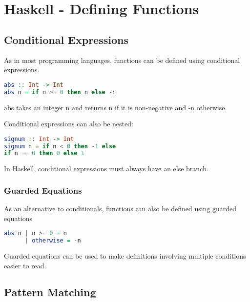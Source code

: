 \hypertarget{haskell}{%
\section{Haskell - Defining Functions}\label{haskell}}

\hypertarget{conditional-expressions}{%
\subsection{Conditional Expressions}\label{conditional-expressions}}

As in most programming languages, functions can be defined using
conditional expressions.

\begin{lstlisting}[language=Haskell]
abs :: Int -> Int
abs n = if n >= 0 then n else -n
\end{lstlisting}

abs takes an integer n and returns n if it is non-negative and -n
otherwise.

Conditional expressions can also be nested:

\begin{lstlisting}[language=Haskell]
signum :: Int -> Int
signum n = if n < 0 then -1 else
if n == 0 then 0 else 1
\end{lstlisting}

\begin{tcolorbox}[colback=red!5!white,colframe=red!75!black]
In Haskell, conditional expressions must always have an else branch.
\end{tcolorbox}

\hypertarget{guarded-equations}{%
\subsubsection{Guarded Equations}\label{guarded-equations}}

As an alternative to conditionals, functions can also be defined using
guarded equations

\begin{lstlisting}[language=Haskell]
abs n | n >= 0 = n
      | otherwise = -n
\end{lstlisting}

Guarded equations can be used to make definitions involving multiple
conditions easier to read.

\hypertarget{pattern-matching}{%
\subsection{Pattern Matching}\label{pattern-matching}}

